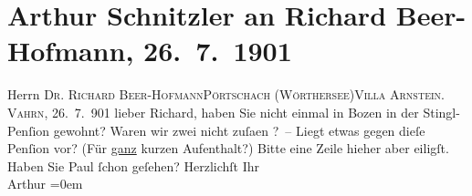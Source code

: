 

         
         \renewcommand{\erwaehntePersonen}{Personen: Richard Beer-Hofmann, Paul Goldmann}
         \renewcommand{\erwaehnteOrte}{Orte: Bozen, Hotel Stiegl, Pörtschach, Vahrn, Villa Arnstein}
         \renewcommand{\erwaehnteWerke}{}
               \section[Arthur Schnitzler an Richard Beer-Hofmann, 26. 7. 1901]{ Arthur Schnitzler an Richard Beer-Hofmann, 26. 7. 1901}\nopagebreak{}\rehead{ }\begin{ledgroupsized}[t]{13cm}\normalsize\beginnumbering \toendnotes[C]{\smallbreak\pagebreak[2]} 
\toendnotes[C]{\smallbreak}\pstart{}{\pb} Herrn \textsc{Dr. Richard
                     Beer-Hofmann}\pend{}\pstart{}\textsc{Pörtschach (Wörthersee)}\pend{}\pstart{}\textsc{Villa Arnstein.}\pend{}{\bigskip}\pstart
           \raggedleft{}{\pb}\textsc{Vahrn}, 26. 7. 901\pend
           \pstart
           lieber Richard, haben Sie nicht einmal in Bozen in der Stingl-Penſion gewohnt? Waren wir zwei nicht zuſa{\geminationm}en \label{K_L01152-1v}\label{K_L01152-1h}? – Liegt etwas gegen dieſe Penſion vor? (Für \uline{ganz} kurzen Aufenthalt?) Bitte eine Zeile hieher {\pb}aber eiligſt.\pend
           \pstart
           Haben Sie Paul ſchon geſehen?\pend
           \pstart
           Herzlichſt Ihr{\\[\baselineskip]}\spacefill\mbox{Arthur}\pend
           \leftskip=0em{}
         
         \endnumbering{}\end{ledgroupsized}  \newcommand{\dateiname}{L01152}\newcommand{\titel}{Arthur Schnitzler an Richard Beer-Hofmann, 26. 7. 1901}\newcommand{\editorInnen}{Martin Anton Müller und Gerd-Hermann Susen}
      